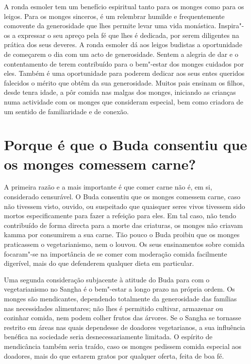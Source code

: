 A ronda esmoler tem um benefício espiritual tanto para os monges como
para os leigos. Para os monges sinceros, é um relembrar humilde e
frequentemente comovente da generosidade que lhes permite levar uma vida
monástica. Inspira"-os a expressar o seu apreço pela fé que lhes é
dedicada, por serem diligentes na prática dos seus deveres. A ronda
esmoler dá aos leigos budistas a oportunidade de começarem o dia com um
acto de generosidade. Sentem a alegria de dar e o contentamento de terem
contribuído para o bem"-estar dos monges cuidados por eles. Também é uma
oportunidade para poderem dedicar aos seus entes queridos falecidos o
mérito que obtêm da sua generosidade. Muitos pais ensinam os filhos,
desde tenra idade, a pôr comida nas malgas dos monges, iniciando as
crianças numa actividade com os monges que consideram especial, bem como
criadora de um sentido de familiaridade e de conexão.

\section{Porque é que o Buda consentiu que os monges comessem carne?}

A primeira razão e a mais importante é que comer carne não é, em si,
considerado censurável. O Buda consentiu que os monges comessem carne,
caso não tivessem visto, ouvido, ou suspeitado que quaisquer seres vivos
tivessem sido mortos especificamente para fazer a refeição para eles. Em
tal caso, não tendo contribuído de forma directa para a morte das
criaturas, os monges não criavam kamma por consumirem a sua carne. Tão
pouco o Buda proibiu que os monges praticassem o vegetarianismo, nem o
louvou. Os seus ensinamentos sobre comida focaram"-se na importância de
se comer com moderação comida facilmente digerível, mais do que
defenderem qualquer dieta em particular.

Uma segunda consideração subjacente à atitude do Buda para com o
vegetarianismo no Sangha é o bem"-estar a longo prazo na própria ordem.
Os monges são mendicantes, dependendo totalmente da generosidade das
famílias nas necessidades alimentares; não lhes é permitido cultivar,
armazenar ou cozinhar comida, nem podem colher frutos das árvores. Se o
Sangha se tornasse restrito em áreas nas quais dependesse de doadores
vegetarianos, a sua influência benéfica na sociedade seria
desnecessariamente limitada. O espírito de mendicância também seria
traído, caso os monges pedissem comida especial aos doadores, mais do
que estarem gratos por qualquer oferta, feita de boa fé.

